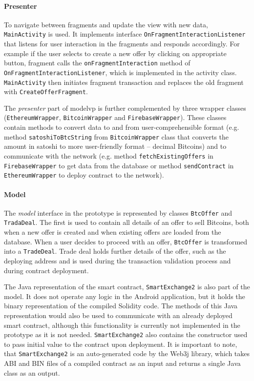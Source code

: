 \paragraph{Presenter} 
\begin{sloppypar}
To navigate between fragments and update the view with new data, \texttt{MainActivity} is used. It implements interface \texttt{OnFragmentInteractionListener} that listens for user interaction in the fragments and responds accordingly. For example if the user selects to create a new offer by clicking on appropriate button, fragment calls the \texttt{onFragmentInteraction} method of \texttt{OnFragmentInteractionListener}, which is implemented in the activity class. \texttt{MainActivity} then initiates fragment transaction and replaces the old fragment with \texttt{CreateOfferFragment}.

The \textit{presenter} part of \acrshort{modelvp} is further complemented by three wrapper classes (\texttt{EthereumWrapper}, \texttt{BitcoinWrapper} and \texttt{FirebaseWrapper}). These classes contain methods to convert data to and from user-comprehensible format (e.g. method \texttt{satoshiToBtcString} from \texttt{BitcoinWrapper} class that converts the amount in satoshi to more user-friendly format -- decimal Bitcoins) and to communicate with the network (e.g. method \texttt{fetchExistingOffers} in \texttt{FirebaseWrapper} to get data from the database or method \texttt{sendContract} in \texttt{EthereumWrapper} to deploy contract to the network).
\end{sloppypar}

\paragraph{Model}
The \textit{model} interface in the prototype is represented by classes \texttt{BtcOffer} and \texttt{TradaDeal}. The first is used to contain all details of an offer to sell Bitcoins, both when a new offer is created and when existing offers are loaded from the database. When a user decides to proceed with an offer, \texttt{BtcOffer} is transformed into a \texttt{TradeDeal}. Trade deal holds further details of the offer, such as the deploying address and is used during the transaction validation process and during contract deployment.

The Java representation of the smart contract, \texttt{SmartExchange2} is also part of the model. It does not operate any logic in the Android application, but it holds the binary representation of the compiled Solidity code. The methods of this Java representation would also be used to communicate with an already deployed smart contract, although this functionality is currently not implemented in the prototype as it is not needed. \texttt{SmartExchange2} also contains the constructor used to pass initial value to the contract upon deployment. It is important to note, that \texttt{SmartExchange2} is an auto-generated code by the Web3j library, which takes ABI and BIN files of a compiled contract as an input and returns a single Java class as an output.



